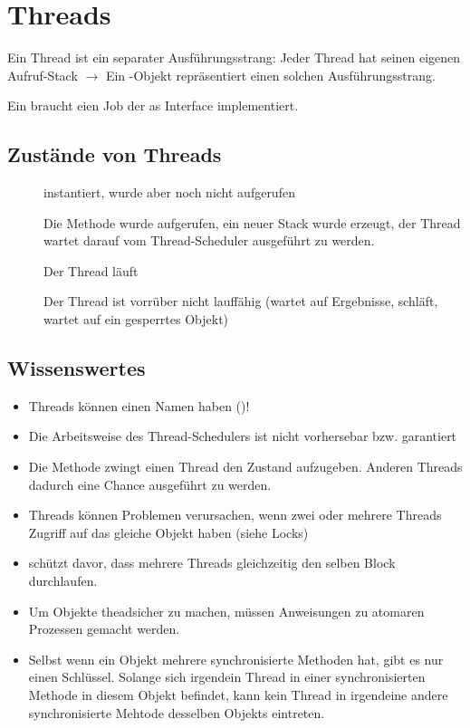 \section{Threads}
Ein Thread ist ein separater Ausführungsstrang: Jeder Thread hat seinen eigenen Aufruf-Stack $\rightarrow$ Ein -Objekt repräsentiert einen solchen Ausführungsstrang.

Ein  braucht eien Job der as  Interface implementiert.

\subsection{Zustände von Threads}
\begin{description}
	\item [] instantiert,  wurde aber noch nicht aufgerufen
	\item [] Die  Methode wurde aufgerufen, ein neuer Stack wurde erzeugt, der Thread wartet darauf vom Thread-Scheduler ausgeführt zu werden.
	\item [] Der Thread läuft
	\item [] Der Thread ist vorrüber nicht lauffähig (wartet auf Ergebnisse, schläft, wartet auf ein gesperrtes Objekt)
\end{description}

\subsection{Wissenswertes}
\begin{itemize}\itemsep0em
	\item Threads können einen Namen haben ()!
	\item Die Arbeitsweise des Thread-Schedulers ist nicht vorhersebar bzw. garantiert
	\item Die Methode  zwingt einen Thread den Zustand  aufzugeben. Anderen Threads dadurch eine Chance ausgeführt zu werden.
	\item Threads können Problemen verursachen, wenn zwei oder mehrere Threads Zugriff
	auf das gleiche Objekt haben (siehe Locks)
	\item {} schützt davor, dass mehrere Threads gleichzeitig den
	selben Block durchlaufen.	
	\item Um Objekte theadsicher zu machen, müssen Anweisungen zu atomaren Prozessen gemacht werden.
	\item Selbst wenn ein Objekt mehrere synchronisierte Methoden hat, gibt es nur einen Schlüssel. Solange sich irgendein Thread in einer synchronisierten Methode in diesem Objekt befindet, kann kein Thread in irgendeine andere synchronisierte Mehtode desselben Objekts eintreten.
\end{itemize}


